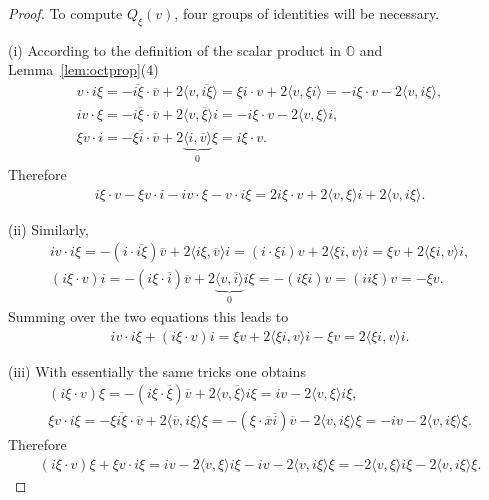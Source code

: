 \documentclass[pdftex]{sigma}
\numberwithin{equation}{section}
\newcommand{\SO}{\mathbb{O}} %
\begin{document}
\begin{proof} To compute $Q_\xi(v)$, four groups of identities will be necessary.

(i) According to the definition of the scalar product in $\SO$ and Lemma~\ref{lem:octprop}(4)
 \begin{gather*}
 v \cdot i\xi=-\overline{i\xi} \cdot \overline{v}+2\langle v, \overline{i\xi} \rangle = \xi i \cdot v + 2\langle v, \xi i \rangle = -i \xi \cdot v - 2\langle v, i \xi \rangle,\\
 iv\cdot \xi= -i\overline{\xi}\cdot \overline{v}+2 \langle v, \overline{\xi} \rangle i= -i\xi\cdot v - 2 \langle v, \xi \rangle i,\\
 \xi v \cdot i=-\xi \overline{i}\cdot \overline{v}+2 \underbrace{\langle i, \overline{v} \rangle}_0 \xi=i \xi \cdot v.
 \end{gather*}
 Therefore
 \begin{gather}
 i\xi \cdot v-\xi v \cdot i- iv\cdot \xi-v\cdot i\xi=2i\xi\cdot v +2 \langle v,\xi \rangle i+2\langle v,i \xi \rangle. \label{eq:gxi1}
 \end{gather}

(ii) Similarly,
 \begin{gather*}
 iv\cdot i\xi =-(i\cdot \overline{i\xi})\overline{v}+2\langle i\xi,\overline{v}\rangle i=(i\cdot \xi i)v+2\langle \xi i,v \rangle i=\xi v +2\langle \xi i,v \rangle i,\\
 (i\xi\cdot v)i =-(i\xi\cdot\overline{i})\overline{v}+2\underbrace{\langle v, \overline{i} \rangle}_0 i\xi=-(i\xi i)v=(ii\xi)v=-\xi v.
 \end{gather*}
 Summing over the two equations this leads to
 \begin{gather}
 iv\cdot i\xi+(i\xi\cdot v)i=\xi v +2\langle \xi i,v \rangle i-\xi v=2\langle \xi i,v \rangle i. \label{eq:gxi2}
 \end{gather}

(iii) With essentially the same tricks one obtains
 \begin{gather*}
 (i\xi \cdot v)\xi=-(i\xi \cdot \overline{\xi})\overline{v}+2 \langle v,\overline{\xi}\rangle i\xi=iv-2\langle v ,\xi \rangle i\xi,\\
 \xi v\cdot i\xi=-\xi \overline{i\xi}\cdot \overline{v}+2 \langle\overline{v},i\xi\rangle\xi=-(\xi\cdot \overline{x}\overline{i})\overline{v}-2\langle v,i\xi\rangle\xi =-iv-2\langle v,i\xi \rangle\xi.
 \end{gather*}
 Therefore
 \begin{gather}
 (i\xi\cdot v)\xi+\xi v\cdot i\xi=iv-2\langle v ,\xi \rangle i\xi-iv-2\langle v,i\xi \rangle\xi=-2\langle v ,\xi \rangle i\xi-2\langle v,i\xi \rangle\xi. \label{eq:gxi3}
 \end{gather}


\end{proof}
\end{document}
